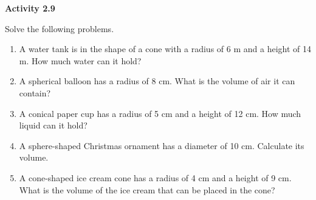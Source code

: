  \vspace{1ex}
\noindent\textbf{Activity 2.9}

\vspace{0.75ex}

Solve the following problems.
\begin{enumerate}[noitemsep, label = \color{blue}\arabic*. ]
    \item A water tank is in the shape of a cone with a radius of 6 m and a height of 14 m. How much water can it hold?
    \item A spherical balloon has a radius of 8 cm. What is the volume of air it can contain?
    \item A conical paper cup has a radius of 5 cm and a height of 12 cm. How much liquid can it hold?
    \item A sphere-shaped Christmas ornament has a diameter of 10 cm. Calculate its volume.
    \item A cone-shaped ice cream cone has a radius of 4 cm and a height of 9 cm. What is the volume of the ice cream that can be placed in the cone?
\end{enumerate}

 
